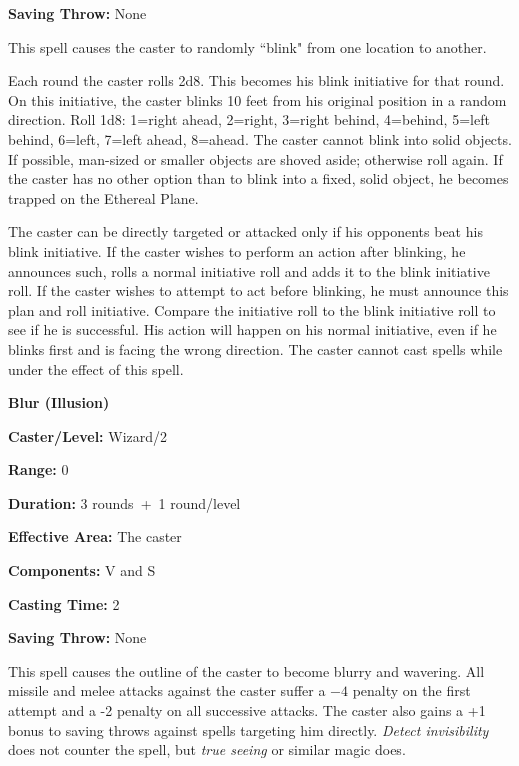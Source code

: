 \begin{multicols}{2}
\begin{minipage}{\columnwidth}
\noindent \textbf{Saving Throw:} None

\end{minipage}

This spell causes the caster to randomly ``blink" from one location to another.  

Each round the caster rolls 2d8.  This becomes his blink initiative for that round.  On this initiative, the caster blinks 10 feet from his original position in a random direction.  Roll 1d8: 1=right ahead, 2=right, 3=right behind, 4=behind, 5=left behind, 6=left, 7=left ahead, 8=ahead.  The caster cannot blink into solid objects.  If possible, man-sized or smaller objects are shoved aside; otherwise roll again.  If the caster has no other option than to blink into a fixed, solid object, he becomes trapped on the Ethereal Plane.

The caster can be directly targeted or attacked only if his opponents beat his blink initiative.  If the caster wishes to perform an action after blinking, he announces such, rolls a normal initiative roll and adds it to the blink initiative roll.  If the caster wishes to attempt to act before blinking, he must announce this plan and roll initiative.  Compare the initiative roll to the blink initiative roll to see if he is successful.  His action will happen on his normal initiative, even if he blinks first and is facing the wrong direction.  The caster cannot cast spells while under the effect of this spell.

\vspace{1em}

\noindent
\begin{minipage}{\columnwidth}

\noindent \textbf{Blur (Illusion)}

\noindent \textbf{Caster/Level:} Wizard/2

\noindent \textbf{Range:} 0

\noindent \textbf{Duration:} 3 rounds~+~1 round/level

\noindent \textbf{Effective Area:} The caster

\noindent \textbf{Components:} V and S

\noindent \textbf{Casting Time:} 2

\noindent \textbf{Saving Throw:} None

\end{minipage}

This spell causes the outline of the caster to become blurry and wavering.  All missile and melee attacks against the caster suffer a $-4$ penalty on the first attempt and a -2 penalty on all successive attacks.  The caster also gains a +1 bonus to saving throws against spells targeting him directly.  \textit{Detect invisibility} does not counter the spell, but \textit{true seeing} or similar magic does.


\end{multicols}
